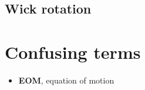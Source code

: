 \documentclass[hyperref, a4paper]{article}
\newcommand*{\concept}[1]{{\textbf{#1}}}
\begin{document}
\subsection{Wick rotation}

\section{Confusing terms}

\begin{itemize}
    \item \concept{EOM}, equation of motion
\end{itemize}


 
\end{document}
